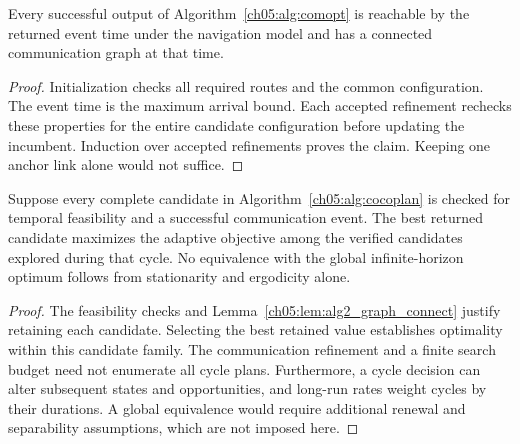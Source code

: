 \begin{revision}
\begin{lemma}
\label{ch05:lem:alg2_graph_connect}
Every successful output of Algorithm~\ref{ch05:alg:comopt} is reachable
by the returned event time under the navigation model and has a connected
communication graph at that time.
\end{lemma}
\begin{proof}
Initialization checks all required routes and the common configuration.
The event time is the maximum arrival bound. Each accepted refinement
rechecks these properties for the entire candidate configuration before
updating the incumbent. Induction over accepted refinements proves the
claim. Keeping one anchor link alone would not suffice.
\end{proof}

\begin{theorem}
\label{ch05:thm:cocoplan_opt}
Suppose every complete candidate in Algorithm~\ref{ch05:alg:cocoplan}
is checked for temporal feasibility and a successful communication event.
The best returned candidate maximizes the adaptive objective among the
verified candidates explored during that cycle. No equivalence with the
global infinite-horizon optimum follows from stationarity and ergodicity
alone.
\end{theorem}
\begin{proof}
The feasibility checks and Lemma~\ref{ch05:lem:alg2_graph_connect} justify
retaining each candidate. Selecting the best retained value establishes
optimality within this candidate family. The communication refinement and
a finite search budget need not enumerate all cycle plans. Furthermore,
a cycle decision can alter subsequent states and opportunities, and long-run
rates weight cycles by their durations. A global equivalence would require
additional renewal and separability assumptions, which are not imposed here.
\end{proof}
\end{revision}
